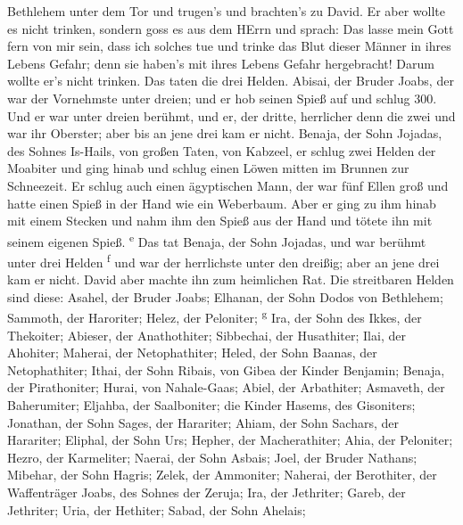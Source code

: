 Bethlehem unter dem Tor und trugen's und brachten's zu David. Er aber
wollte es nicht trinken, sondern goss es aus dem HErrn 
und sprach: Das lasse mein Gott fern von mir sein, dass ich solches tue
und trinke das Blut dieser Männer in ihres Lebens Gefahr; denn sie
haben's mit ihres Lebens Gefahr hergebracht! Darum wollte er's nicht
trinken. Das taten die drei Helden.  Abisai, der Bruder
Joabs, der war der Vornehmste unter dreien; und er hob seinen Spieß auf
und schlug 300. Und er war unter dreien berühmt,  und er,
der dritte, herrlicher denn die zwei und war ihr Oberster; aber bis an
jene drei kam er nicht.  Benaja, der Sohn Jojadas, des
Sohnes Is-Hails, von großen Taten, von Kabzeel, er schlug zwei Helden
der Moabiter und ging hinab und schlug einen Löwen mitten im Brunnen zur
Schneezeit.  Er schlug auch einen ägyptischen Mann, der
war fünf Ellen groß und hatte einen Spieß in der Hand wie ein Weberbaum.
Aber er ging zu ihm hinab mit einem Stecken und nahm ihm den Spieß aus
der Hand und tötete ihn mit seinem eigenen Spieß. \textsuperscript{e}
 Das tat Benaja, der Sohn Jojadas, und war berühmt unter
drei Helden \textsuperscript{f}  und war der herrlichste
unter den dreißig; aber an jene drei kam er nicht. David aber machte ihn
zum heimlichen Rat.  Die streitbaren Helden sind diese:
Asahel, der Bruder Joabs; Elhanan, der Sohn Dodos von Bethlehem;
 Sammoth, der Haroriter; Helez, der Peloniter;
\textsuperscript{g}  Ira, der Sohn des Ikkes, der
Thekoiter; Abieser, der Anathothiter;  Sibbechai, der
Husathiter; Ilai, der Ahohiter;  Maherai, der
Netophathiter; Heled, der Sohn Baanas, der Netophathiter;
 Ithai, der Sohn Ribais, von Gibea der Kinder Benjamin;
Benaja, der Pirathoniter;  Hurai, von Nahale-Gaas; Abiel,
der Arbathiter;  Asmaveth, der Baherumiter; Eljahba, der
Saalboniter;  die Kinder Hasems, des Gisoniters;
Jonathan, der Sohn Sages, der Harariter;  Ahiam, der Sohn
Sachars, der Harariter; Eliphal, der Sohn Urs;  Hepher,
der Macherathiter; Ahia, der Peloniter;  Hezro, der
Karmeliter; Naerai, der Sohn Asbais;  Joel, der Bruder
Nathans; Mibehar, der Sohn Hagris;  Zelek, der Ammoniter;
Naherai, der Berothiter, der Waffenträger Joabs, des Sohnes der Zeruja;
 Ira, der Jethriter; Gareb, der Jethriter;
 Uria, der Hethiter; Sabad, der Sohn Ahelais;
